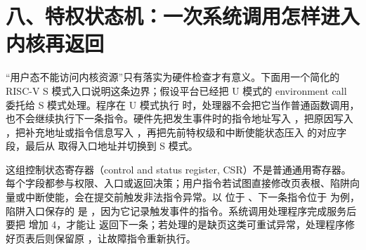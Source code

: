 \section{八、特权状态机：一次系统调用怎样进入内核再返回}

“用户态不能访问内核资源”只有落实为硬件检查才有意义。下面用一个简化的 RISC-V S 模式入口说明这条边界；假设平台已经把 U 模式的 environment call 委托给 S 模式处理。程序在 U 模式执行  时，处理器不会把它当作普通函数调用，也不会继续执行下一条指令。硬件先把发生事件时的指令地址写入 ，把原因写入 ，把补充地址或指令信息写入 ，再把先前特权级和中断使能状态压入  的对应字段，最后从  取得入口地址并切换到 S 模式。\cite{riscv-priv}

这组控制状态寄存器（control and status register, CSR）不是普通通用寄存器。每个字段都参与权限、入口或返回决策；用户指令若试图直接修改页表根、陷阱向量或中断使能，会在提交前触发非法指令异常。以  位于 、下一条指令位于  为例，陷阱入口保存的  是 ，因为它记录触发事件的指令。系统调用处理程序完成服务后要把  增加 4，才能让  返回下一条；若处理的是缺页这类可重试异常，处理程序修好页表后则保留原 ，让故障指令重新执行。

